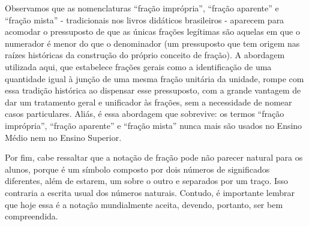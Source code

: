 Observamos que as nomenclaturas ``fração imprópria'', ``fração aparente'' e ``fração mista'' - tradicionais nos livros didáticos brasileiros - aparecem para acomodar o pressuposto de que as únicas frações legítimas são aquelas em que o numerador é menor do que o denominador (um pressuposto que tem origem nas raízes históricas da construção do próprio conceito de fração).
A abordagem utilizada aqui, que estabelece frações gerais como a identificação de uma quantidade igual à junção de uma mesma fração unitária da unidade, rompe com essa tradição histórica ao dispensar esse pressuposto, com a grande vantagem de dar um tratamento geral e unificador às frações, sem a necessidade de nomear casos particulares.
Aliás, é essa abordagem que sobrevive: os termos ``fração imprópria'', ``fração aparente'' e ``fração mista'' nunca mais são usados no Ensino Médio nem no Ensino Superior.

Por fim, cabe ressaltar que a notação de fração pode não parecer natural para os alunos, porque é um símbolo composto por dois números de significados diferentes, além de estarem, um sobre o outro e separados por um traço. Isso contraria a escrita usual dos números naturais. Contudo, é importante lembrar que hoje essa é a notação mundialmente aceita, devendo, portanto, ser bem compreendida.

